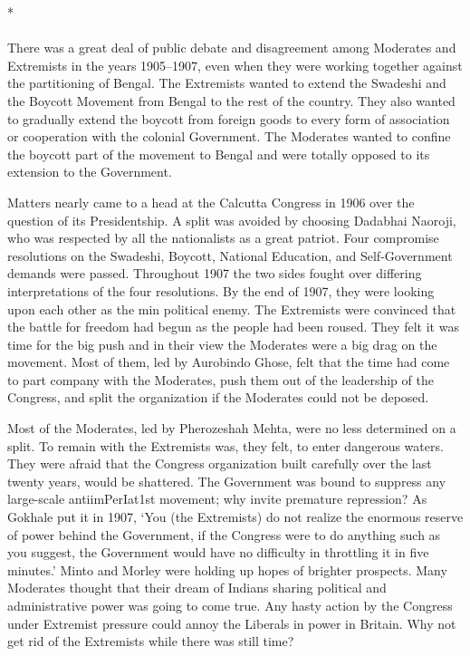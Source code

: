 \begin{center}*\end{center}

\paragraph*{}

There was a great deal of public debate and disagreement among Moderates and Extremists in the years 1905--1907, even when they were working together against the partitioning of Bengal. The Extremists wanted to extend the Swadeshi and the Boycott Movement from Bengal to the rest of the country. They also wanted to gradually extend the boycott from foreign goods to every form of association or cooperation with the colonial Government. The Moderates wanted to confine the boycott part of the movement to Bengal and were totally opposed to its extension to the Government.

Matters nearly came to a head at the Calcutta Congress in 1906 over the question of its Presidentship. A split was avoided by choosing Dadabhai Naoroji, who was respected by all the nationalists as a great patriot. Four compromise resolutions on the Swadeshi, Boycott, National Education, and Self-Government demands were passed. Throughout 1907 the two sides fought over differing interpretations of the four resolutions. By the end of 1907, they were looking upon each other as the min political enemy. The Extremists were convinced that the battle for freedom had begun as the people had been roused. They felt it was time for the big push and in their view the Moderates were a big drag on the movement. Most of them, led by Aurobindo Ghose, felt that the time had come to part company with the Moderates, push them out of the leadership of the Congress, and split the organization if the Moderates could not be deposed.

Most of the Moderates, led by Pherozeshah Mehta, were no less determined on a split. To remain with the Extremists was, they felt, to enter dangerous waters. They were afraid that the Congress organization built carefully over the last twenty years, would be shattered. The Government was bound to suppress any large-scale antiimPerIat1st movement; why invite premature repression? As Gokhale put it in 1907, `You (the Extremists) do not realize the enormous reserve of power behind the Government, if the Congress were to do anything such as you suggest, the Government would have no difficulty in throttling it in five minutes.' Minto and Morley were holding up hopes of brighter prospects. Many Moderates thought that their dream of Indians sharing political and administrative power was going to come true. Any hasty action by the Congress under Extremist pressure could annoy the Liberals in power in Britain. Why not get rid of the Extremists while there was still time?

